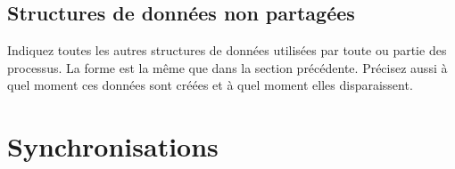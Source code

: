 \documentclass[a4paper]{article}
\makeatletter
\newenvironment{expl}{%
  \begin{list}{}{%
      \small\itshape%
      \topsep\z@%
      \listparindent0pt%
      \parsep0.75\baselineskip%
      \setlength{\leftmargin}{20mm}%
      \setlength{\rightmargin}{20mm}%
    }
  \item[]}%
  {\end{list}}
\makeatother
\begin{document}
% 

\subsection{Structures de données non partagées}

\begin{expl}
  Indiquez toutes les autres structures de données utilisées par
  toute ou partie des processus. La forme est la même que dans la
  section précédente. Précisez aussi à quel moment ces données sont
  créées et à quel moment elles disparaissent.
\end{expl}

\section{Synchronisations}
\end{document}
